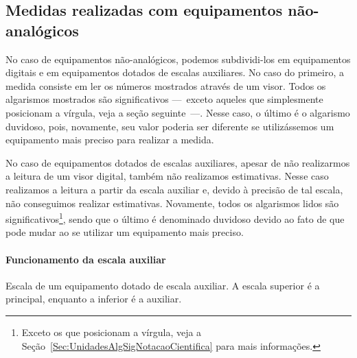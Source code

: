 \pagebreak
\subsection{Medidas realizadas com equipamentos não-analógicos}

No caso de equipamentos não-analógicos, podemos subdividi-los em equipamentos digitais e em equipamentos dotados de escalas auxiliares. No caso do primeiro, a medida consiste em ler os números mostrados através de um visor. Todos os algarismos mostrados são significativos ---~exceto aqueles que simplesmente posicionam a vírgula, veja a seção seguinte~---. Nesse caso, o último é o algarismo duvidoso, pois, novamente, seu valor poderia ser diferente se utilizássemos um equipamento mais preciso para realizar a medida.

No caso de equipamentos dotados de escalas auxiliares, apesar de não realizarmos a leitura de um visor digital, também não realizamos estimativas. Nesse caso realizamos a leitura a partir da escala auxiliar e, devido à precisão de tal escala, não conseguimos realizar estimativas. Novamente, todos os algarismos lidos são significativos\footnote{Exceto os que posicionam a vírgula, veja a Seção~\ref{Sec:UnidadesAlgSigNotacaoCientifica} para mais informações.}, sendo que o último é denominado duvidoso devido ao fato de que pode mudar ao se utilizar um equipamento mais preciso.

\paragraph{Funcionamento da escala auxiliar}

\begin{marginfigure}[2 cm]
\centering
{}
\caption{Escala de um equipamento dotado de escala auxiliar. A escala superior é a principal, enquanto a inferior é a auxiliar.\label{Fig:NonioFechado}}
\end{marginfigure}


